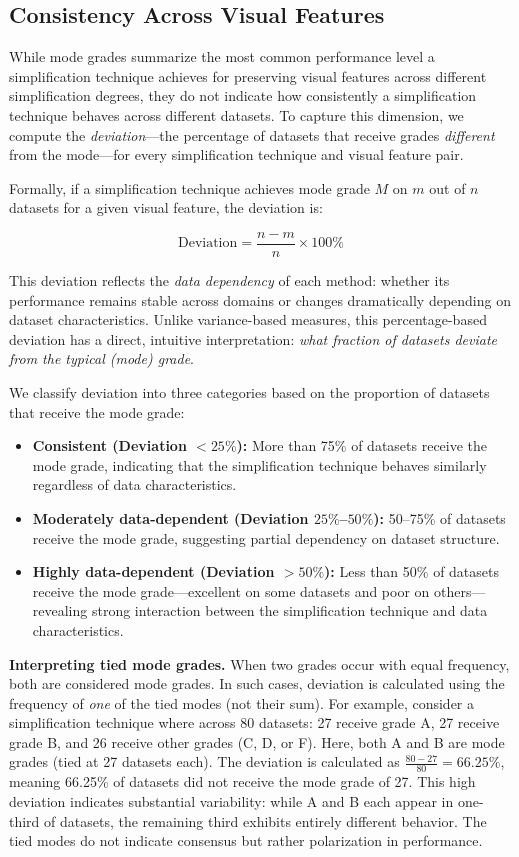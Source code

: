 \subsection{Consistency Across Visual Features}
While mode grades summarize the most common performance level a simplification technique achieves for preserving visual features across different simplification degrees, they do not indicate how consistently a simplification technique behaves across different datasets. To capture this dimension, we compute the \emph{deviation}---the percentage of datasets that receive grades \emph{different} from the mode---for every simplification technique and visual feature pair.

Formally, if a simplification technique achieves mode grade $M$ on $m$ out of $n$ datasets for a given visual feature, the deviation is:

$$\text{Deviation} = \frac{n - m}{n} \times 100\%$$

This deviation reflects the \emph{data dependency} of each method: whether its performance remains stable across domains or changes dramatically depending on dataset characteristics. Unlike variance-based measures, this percentage-based deviation has a direct, intuitive interpretation: \emph{what fraction of datasets deviate from the typical (mode) grade}.

We classify deviation into three categories based on the proportion of datasets that receive the mode grade:

\begin{itemize}
    \item \textbf{Consistent (Deviation $< 25\%$):} More than 75\% of datasets receive the mode grade, indicating that the simplification technique behaves similarly regardless of data characteristics.
    \item \textbf{Moderately data-dependent (Deviation $25\%$--$50\%$):} 50--75\% of datasets receive the mode grade, suggesting partial dependency on dataset structure.
    \item \textbf{Highly data-dependent (Deviation $> 50\%$):} Less than 50\% of datasets receive the mode grade---excellent on some datasets and poor on others---revealing strong interaction between the simplification technique and data characteristics.
\end{itemize}

\textbf{Interpreting tied mode grades.} When two grades occur with equal frequency, both are considered mode grades. In such cases, deviation is calculated using the frequency of \emph{one} of the tied modes (not their sum). For example, consider a simplification technique where across 80 datasets: 27 receive grade A, 27 receive grade B, and 26 receive other grades (C, D, or F). Here, both A and B are mode grades (tied at 27 datasets each). The deviation is calculated as $\frac{80 - 27}{80} = 66.25\%$, meaning 66.25\% of datasets did not receive the mode grade of 27. This high deviation indicates substantial variability: while A and B each appear in one-third of datasets, the remaining third exhibits entirely different behavior. The tied modes do not indicate consensus but rather polarization in performance.


